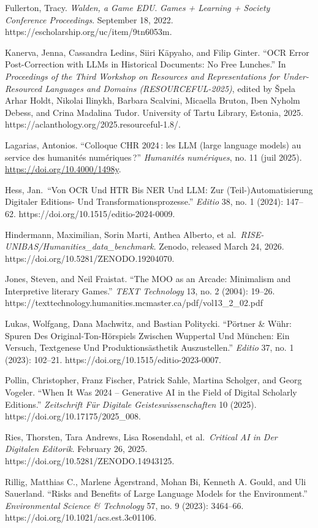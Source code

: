 \documentclass[
  letterpaper,
  DIV=11,
  numbers=noendperiod]{scrreprt}
\begin{document}
Fullerton, Tracy. \emph{Walden, a Game EDU}. \emph{Games + Learning +
Society Conference Proceedings}. September 18, 2022.
https://escholarship.org/uc/item/9tn6053m.

Kanerva, Jenna, Cassandra Ledins, Siiri Käpyaho, and Filip Ginter. ``OCR
Error Post-Correction with LLMs in Historical Documents: No Free
Lunches.'' In \emph{Proceedings of the Third Workshop on Resources and
Representations for Under-Resourced Languages and Domains
(RESOURCEFUL-2025)}, edited by Špela Arhar Holdt, Nikolai Ilinykh,
Barbara Scalvini, Micaella Bruton, Iben Nyholm Debess, and Crina
Madalina Tudor. University of Tartu Library, Estonia, 2025.
https://aclanthology.org/2025.resourceful-1.8/.

Lagarias, Antonios. ``Colloque CHR 2024\,: les LLM (large language
models) au service des humanités numériques\,?'' \emph{Humanités
numériques}, no. 11 (juil 2025). \url{https://doi.org/10.4000/1498y}.

Hess, Jan.~``Von OCR Und HTR Bis NER Und LLM: Zur (Teil-)Automatisierung
Digitaler Editions- Und Transformationsprozesse.'' \emph{Editio} 38, no.
1 (2024): 147--62. https://doi.org/10.1515/editio-2024-0009.

Hindermann, Maximilian, Sorin Marti, Anthea Alberto, et
al.~\emph{RISE-UNIBAS/Humanities\_data\_benchmark}. Zenodo, released
March 24, 2026. https://doi.org/10.5281/ZENODO.19204070.

Jones, Steven, and Neil Fraistat. ``The MOO as an Arcade: Minimalism and
Interpretive literary Games.'' \emph{TEXT Technology} 13, no. 2 (2004):
19--26.
https://texttechnology.humanities.mcmaster.ca/pdf/vol13\_2\_02.pdf

Lukas, Wolfgang, Dana Machwitz, and Bastian Politycki. ``Pörtner \&
Wühr: Spuren Des Original-Ton-Hörspiels Zwischen Wuppertal Und München:
Ein Versuch, Textgenese Und Produktionsästhetik Auszustellen.''
\emph{Editio} 37, no. 1 (2023): 102--21.
https://doi.org/10.1515/editio-2023-0007.

Pollin, Christopher, Franz Fischer, Patrick Sahle, Martina Scholger, and
Georg Vogeler. ``When It Was 2024 -- Generative AI in the Field of
Digital Scholarly Editions.'' \emph{Zeitschrift Für Digitale
Geisteswissenschaften} 10 (2025). https://doi.org/10.17175/2025\_008.

Ries, Thorsten, Tara Andrews, Lisa Rosendahl, et al.~\emph{Critical AI
in Der Digitalen Editorik}. February 26, 2025.
https://doi.org/10.5281/ZENODO.14943125.

Rillig, Matthias C., Marlene Ågerstrand, Mohan Bi, Kenneth A. Gould, and
Uli Sauerland. ``Risks and Benefits of Large Language Models for the
Environment.'' \emph{Environmental Science \& Technology} 57, no. 9
(2023): 3464--66. https://doi.org/10.1021/acs.est.3c01106.
\end{document}
